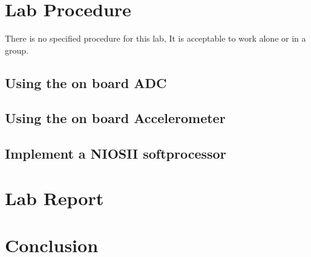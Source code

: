   \section{\bfseries Lab Procedure}
    There is no specified procedure for this lab, It is acceptable to work alone or in a group.

    \subsection{Using the on board ADC}
    \subsection{Using the on board Accelerometer}
    \subsection{Implement a NIOSII softprocessor}

  \section{\bfseries Lab Report}
    
  \section{\bfseries Conclusion}
   

